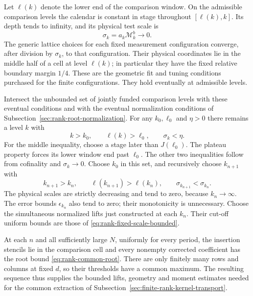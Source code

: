 Let $\ell(k)$ denote the lower end of the comparison window. On the
admissible comparison levels the calendar is constant in stage throughout
$[\ell(k),k]$. Its depth tends to infinity, and its physical test scale is
\[
                       \sigma_k=a_k\mathcal M_k^b\longrightarrow0.
\]
The generic lattice choices for each fixed measurement configuration
converge, after division by $\sigma_k$, to that configuration. Their
physical coordinates lie in the middle half of a cell at level $\ell(k)$;
in particular they have the fixed relative boundary margin $1/4$.
These are the geometric fit and tuning conditions purchased for the
finite configurations. They hold eventually at admissible levels.

Intersect the unbounded set of jointly funded comparison levels with
these eventual conditions and with the eventual normalization conditions
of Subsection~\ref{sec:rank-root-normalization}. For any $k_0,\ell_0$ and
$\eta>0$ there remains a level $k$ with
\[
                  k>k_0,\qquad \ell(k)>\ell_0,
                  \qquad \sigma_k<\eta.
\]
For the middle inequality, choose a stage later than $J(\ell_0)$.
The plateau property forces its lower window end past $\ell_0$.
The other two inequalities follow from cofinality and $\sigma_k\to0$.
Choose $k_0$ in this set, and recursively choose $k_{n+1}$ with
\[
 k_{n+1}>k_n,\qquad \ell(k_{n+1})>\ell(k_n),
                      \qquad \sigma_{k_{n+1}}<\sigma_{k_n}.
\]
The physical scales are strictly decreasing and tend to zero, because
$k_n\to\infty$. The error bounds $\epsilon_{k_n}$ also tend to zero;
their monotonicity is unnecessary. Choose the simultaneous normalized
lifts just constructed at each $k_n$. Their cut-off uniform bounds are
those of \eqref{eq:rank-fixed-scale-bounded}.

At each $n$ and all sufficiently large $N$, uniformly for every period,
the insertion stencils lie in the comparison cell and every nonempty
corrected coefficient has the root bound \eqref{eq:rank-common-root}.
There are only finitely many rows and columns at fixed $d$, so their
thresholds have a common maximum. The resulting sequence thus supplies
the bounded lifts, geometry and moment estimates needed for the common
extraction of Subsection~\ref{sec:finite-rank-kernel-transport}.

